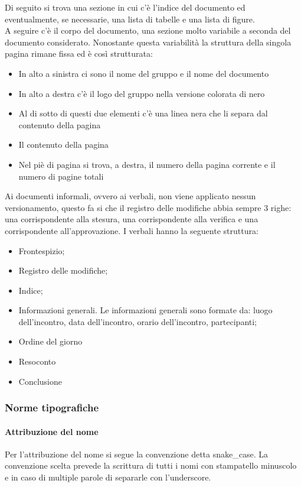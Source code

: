 \documentclass[../norme-di-progetto.tex]{subfiles}
\begin{document}
Di seguito si trova una sezione in cui c'è l'indice del documento ed eventualmente, se necessarie, una lista di tabelle e una lista di figure.\\
A seguire c'è il corpo del documento, una sezione molto variabile a seconda del documento considerato. Nonostante questa variabilità la struttura della singola pagina rimane fissa ed è così strutturata:
\begin{itemize}
    \item In alto a sinistra ci sono il nome del gruppo e il nome del documento
    \item In alto a destra c'è il logo del gruppo nella versione colorata di nero
    \item Al di sotto di questi due elementi c'è una linea nera che li separa dal contenuto della pagina
    \item Il contenuto della pagina 
    \item Nel piè di pagina si trova, a destra, il numero della pagina corrente e il numero di pagine totali
\end{itemize}
Ai documenti informali, ovvero ai verbali, non viene applicato nessun versionamento, questo fa si che il registro delle modifiche abbia sempre 3 righe: una corrispondente alla stesura, una corrispondente alla verifica e una corrispondente all'approvazione. I verbali hanno la seguente struttura:
\begin{itemize}
    \item Frontespizio;
    \item Registro delle modifiche;
    \item Indice;
    \item Informazioni generali. Le informazioni generali sono formate da: luogo dell'incontro, data dell'incontro, orario dell'incontro, partecipanti;
    \item Ordine del giorno
    \item Resoconto
    \item Conclusione
\end{itemize}

\subsubsection{Norme tipografiche}

\paragraph{Attribuzione del nome}
Per l'attribuzione del nome si segue la convenzione detta snake\_case. La convenzione scelta prevede la scrittura di tutti i nomi con stampatello minuscolo e in caso di multiple parole di separarle con l'underscore.
\end{document}
